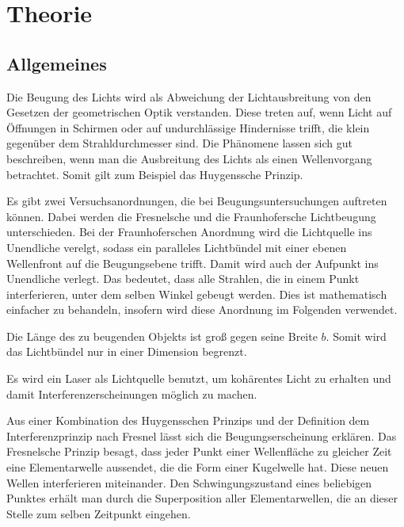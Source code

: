 \section{Theorie}
\label{sec:Theorie}

\subsection{Allgemeines}
Die Beugung des Lichts wird als Abweichung der 
Lichtausbreitung von den Gesetzen der geometrischen Optik 
verstanden. Diese treten auf, wenn Licht auf Öffnungen in 
Schirmen oder auf undurchlässige Hindernisse trifft, die klein
gegenüber dem Strahldurchmesser sind. Die 
Phänomene lassen sich gut beschreiben, wenn man die 
Ausbreitung des Lichts als einen Wellenvorgang betrachtet. 
Somit gilt zum Beispiel das Huygenssche Prinzip. %

Es gibt zwei Versuchsanordnungen, die bei Beugungsuntersuchungen 
auftreten können. Dabei werden die Fresnelsche und die 
Fraunhofersche Lichtbeugung unterschieden. Bei der 
Fraunhoferschen Anordnung wird die Lichtquelle ins Unendliche 
verelgt, sodass ein paralleles Lichtbündel mit einer ebenen 
Wellenfront auf die Beugungsebene trifft. Damit wird auch der Aufpunkt 
ins Unendliche  verlegt. Das bedeutet, dass alle Strahlen, die 
in einem Punkt interferieren, unter dem selben Winkel gebeugt 
werden. Dies ist mathematisch einfacher zu behandeln, insofern 
wird diese Anordnung im Folgenden verwendet. 

Die Länge des zu beugenden Objekts ist groß gegen seine 
Breite $b$. Somit wird das Lichtbündel nur in einer 
Dimension begrenzt.

Es wird ein Laser als Lichtquelle benutzt, um kohärentes Licht 
zu erhalten und damit Interferenzerscheinungen möglich zu machen. 

Aus einer Kombination des Huygensschen Prinzips und der 
Definition dem Interferenzprinzip nach Fresnel lässt sich die 
Beugungserscheinung erklären. Das Fresnelsche Prinzip besagt, 
dass jeder Punkt einer Wellenfläche zu gleicher Zeit eine 
Elementarwelle aussendet, die die Form einer Kugelwelle hat. 
Diese neuen Wellen interferieren miteinander. Den 
Schwingungszustand eines beliebigen Punktes erhält man durch 
die Superposition aller Elementarwellen, die an dieser Stelle zum 
selben Zeitpunkt eingehen. 

